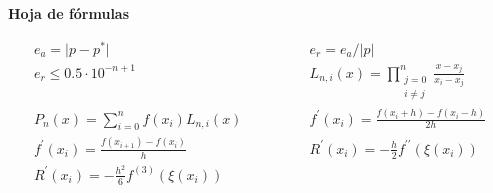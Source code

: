 \documentclass[12pt]{article}
\begin{document}
\begin{center}
\textbf{Hoja de fórmulas}
\end{center}
{\large
\[
\begin{array}{cc}
e_a = \vert p - p^* \vert \qquad & \qquad e_r = e_a/\vert p \vert \\
e_r \leq 0.5 \cdot 10^{-n+1} \qquad & \qquad
L_{n, i}(x) = \prod\limits_{\substack{j=0\\ i \neq j}}^n \frac{x - x_j}{x_i - x_j} \\
P_n(x) = \sum\limits_{i = 0}^n f(x_i)L_{n,i}(x)  \qquad & \qquad f^\prime(x_i) = \frac{f(x_i + h) - f(x_i - h)}{2h}\\
f^\prime(x_i) = \frac{f(x_{i+1})-f(x_i)}{h} \qquad & \qquad
R^\prime(x_i) = -\frac{h}{2}f^{\prime\prime}(\xi(x_i)) \\
R^\prime(x_i) = -\frac{h^2}{6}f^{(3)}(\xi(x_i)) &

\end{array}\]}
\end{document}
